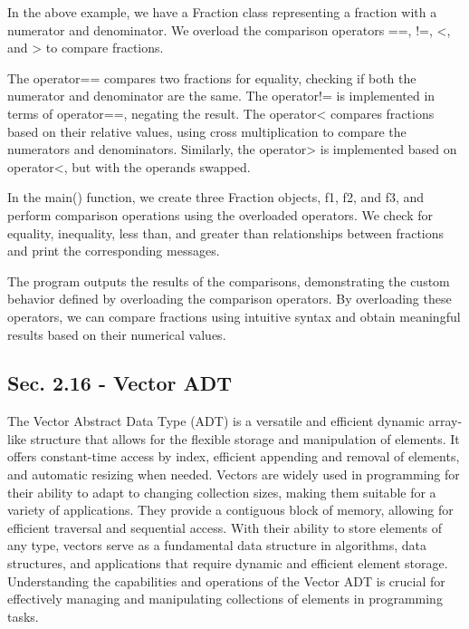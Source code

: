 \begin{solution}
    \horizontalline

    In the above example, we have a Fraction class representing a fraction with a numerator and denominator. We overload the comparison operators ==, !=, <, and > to compare fractions.

    \noindent The operator== compares two fractions for equality, checking if both the numerator and denominator are the same. The operator!= is implemented in terms of operator==, negating the result. The operator< compares fractions based on their relative values, using cross multiplication to compare the numerators and 
    denominators. Similarly, the operator> is implemented based on operator<, but with the operands swapped.

    \noindent In the main() function, we create three Fraction objects, f1, f2, and f3, and perform comparison operations using the overloaded operators. We check for equality, inequality, less than, and greater than relationships between fractions and print the corresponding messages.

    \noindent The program outputs the results of the comparisons, demonstrating the custom behavior defined by overloading the comparison operators. By overloading these operators, we can compare fractions using intuitive syntax and obtain meaningful results based on their numerical values.
\end{solution}

\subsection*{Sec. 2.16 - Vector ADT}

The Vector Abstract Data Type (ADT) is a versatile and efficient dynamic array-like structure that allows for the flexible storage and manipulation of elements. It offers constant-time access by index, efficient appending and removal of elements, and automatic resizing when needed. Vectors are widely used in programming for 
their ability to adapt to changing collection sizes, making them suitable for a variety of applications. They provide a contiguous block of memory, allowing for efficient traversal and sequential access. With their ability to store elements of any type, vectors serve as a fundamental data structure in algorithms, data structures, 
and applications that require dynamic and efficient element storage. Understanding the capabilities and operations of the Vector ADT is crucial for effectively managing and manipulating collections of elements in programming tasks.

